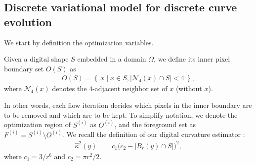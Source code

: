 \documentclass[smallextended]{svjour3}       %
\begin{document}
\subsection{Discrete variational model for discrete curve evolution}

We start by definition the optimization variables.
\begin{definition}
Given a digital shape $S$ embedded in a domain $\Omega$, we define its inner pixel boundary set $O(S)$ as
\begin{align*}
	O(S) = \left\{ \: x \; | \; x \in S, |\mathcal{N}_4(x) \cap S|<4 \: \right\},
\end{align*}
where $\mathcal{N}_4(x)$ denotes the $4$-adjacent neighbor set of $x$ (without $x$).
\end{definition}

In other words, each flow iteration decides which pixels in the inner boundary are to be removed and which are to be kept. To simplify notation, we denote the optimization region of $S^{(i)}$ as $O^{(i)}$, and the foreground set as $F^{(i)} = S^{(i)} \setminus O^{(i)}$. We recall the definition of our digital curvature estimator :
\begin{align}
	\hat{\kappa}^2(y) &= c_1\Big( c_2 - | B_r(y) \cap S | \Big)^2, 
	\label{eq:curvature-estimator-pixels}
\end{align}
where $c_1=3/r^6$ and $c_2=\pi r^2/2$. 
\end{document}
